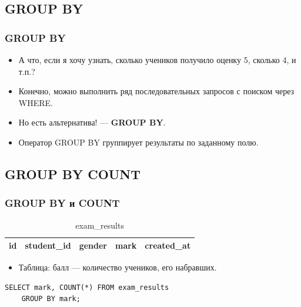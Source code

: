 \documentclass[compress,red]{beamer}
\begin{document}
\subsection{GROUP BY}
\begin{frame}[fragile]
  \frametitle{GROUP BY}
  \begin{itemize}
    \item А что, если я хочу узнать, сколько учеников получило оценку 5, сколько 4, и т.п.?
    \item Конечно, можно выполнить ряд последовательных запросов с поиском через WHERE.
    \item Но есть альтернатива! --- \textbf{GROUP BY}.
    \item Оператор GROUP BY группирует результаты по заданному полю.
  \end{itemize}
\end{frame}

\subsection{GROUP BY COUNT}
\begin{frame}[fragile]
  \frametitle{GROUP BY и COUNT}
  \begin{table}
    \begin{tabular}{|c|c|c|c|c|}
      \hline
      id & student\_id & gender & mark & created\_at\\
      \hline
    \end{tabular}
    \caption{exam\_results}
  \end{table}
  \begin{itemize}
    \item Таблица: балл --- количество учеников, его набравших.
  \end{itemize}
  \scriptsize{
  \begin{lstlisting}[label=sql6,caption=GROUP BY]
    SELECT mark, COUNT(*) FROM exam_results
    GROUP BY mark;
  \end{lstlisting}
  }
\end{frame}
\end{document}
